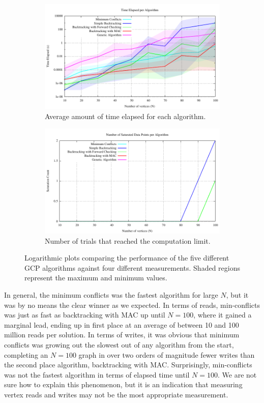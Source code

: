 \documentclass{article}
\begin{document}
\begin{figure}[h!]
\begin{subfigure}{0.49\textwidth}
				\includegraphics[width=\textwidth]{../results_5/comparing_time_performance}
				\caption{Average amount of time elapsed for each algorithm.}
			\end{subfigure}
			\;
			\begin{subfigure}{0.49\textwidth}
				\centering
				\includegraphics[width=\textwidth]{../results_5/comparing_num_saturated}
				\caption{Number of trials that reached the computation limit.}
				\label{comp_limit}
			\end{subfigure}
			\caption{Logarithmic plots comparing the performance of the five different GCP algorithms against four different measurements. Shaded regions represent the maximum and minimum values.}
			\label{results}
		\end{figure}
		
		In general, the minimum conflicts was the fastest algorithm for large $N$, but it was by no means the clear winner as we expected. In terms of reads, min-conflicts was just as fast as backtracking with MAC up until $N=100$, where it gained a marginal lead, ending up in first place at an average of between 10 and 100 million reads per solution. In terms of writes, it was obvious that minimum conflicts was growing out the slowest out of any algorithm from the start, completing an $N=100$ graph in over two orders of magnitude fewer writes than the second place algorithm, backtracking with MAC. Surprisingly, min-conflicts was not the fastest algorithm in terms of elapsed time until $N=100$. We are not sure how to explain this phenomenon, but it is an indication that measuring vertex reads and writes may not be the most appropriate measurement.
		
\end{document}
